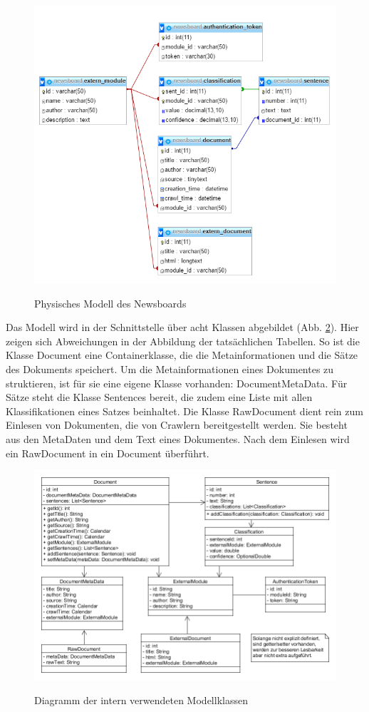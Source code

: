 \begin{figure}[h]
	\centering
	\includegraphics[scale=0.8]{content/physical-model.png}
	\label{physical_model}
	\caption{Physisches Modell des Newsboards}
\end{figure}

Das Modell wird in der Schnittstelle über acht Klassen abgebildet (Abb. \ref{uml_model}).
Hier zeigen sich Abweichungen in der Abbildung der tatsächlichen Tabellen. So ist die
Klasse Document eine Containerklasse, die die Metainformationen und die Sätze des
Dokuments speichert. Um die Metainformationen eines Dokumentes zu struktieren, ist für
sie eine eigene Klasse vorhanden: DocumentMetaData. Für Sätze steht die Klasse Sentences
bereit, die zudem eine Liste mit allen Klassifikationen eines Satzes beinhaltet. Die 
Klasse RawDocument dient rein zum Einlesen von Dokumenten, die von Crawlern bereitgestellt
werden. Sie besteht aus den MetaDaten und dem Text eines Dokumentes. Nach dem Einlesen
wird ein RawDocument in ein Document überführt.

\begin{figure}[h]
	\centering
	\includegraphics[scale=0.5]{content/uml-model.png}
	\label{uml_model}
	\caption{Diagramm der intern verwendeten Modellklassen}
\end{figure}

